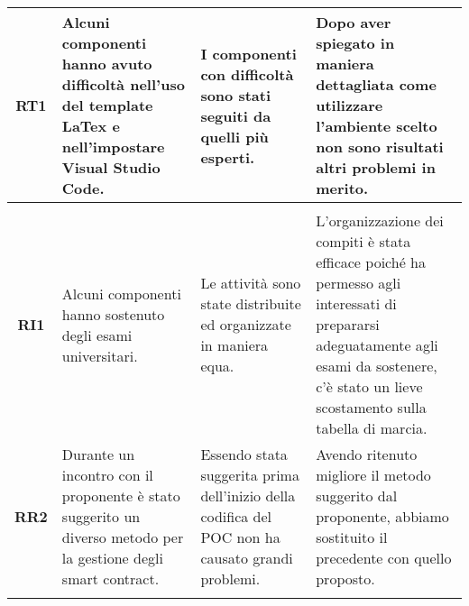 \begin{table}[H]
\begin{tabular}{c|p{5cm}|p{5cm}|p{5cm}}
    \textbf{RT1} & Alcuni componenti hanno avuto difficoltà nell'uso del template LaTex\glo{} e nell'impostare Visual Studio Code\glo{}.                           & I componenti con difficoltà sono stati seguiti da quelli più esperti.                                                                                                                                                              & Dopo aver spiegato in maniera dettagliata come utilizzare l'ambiente scelto non sono risultati altri problemi in merito.                                                                       \\
    \hline
    \rowcolor[HTML]{6BC26B}
    \multicolumn{4}{c}{\textbf{Progettazione della Technology Baseline}}                                                                                                                                                                                                                                                                                                                                                                                                                                                                                                                                 \\
    \hline
    \textbf{RI1} & Alcuni componenti hanno sostenuto degli esami universitari.                                                                                     & Le attività sono state distribuite ed organizzate in maniera equa.                                                                                                                                                                 & L'organizzazione dei compiti è stata efficace poiché ha permesso agli interessati di prepararsi adeguatamente agli esami da sostenere, c'è stato un lieve scostamento sulla tabella di marcia. \\
    \hline
    \textbf{RR2} & Durante un incontro con il proponente è stato suggerito un diverso metodo per la gestione degli smart contract\glo{}.                           & Essendo stata suggerita prima dell'inizio della codifica del POC non ha causato grandi problemi.                                                                                                                                   & Avendo ritenuto migliore il metodo suggerito dal proponente, abbiamo sostituito il precedente con quello proposto.                                                                             \\
    \hline
    \rowcolor[HTML]{6BC26B}

\end{tabular}
\end{table}

